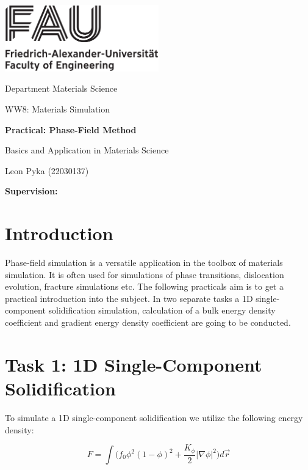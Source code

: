 




%
\begin{titlepage}
\begin{center}
\includegraphics[width=0.5\textwidth]{graphics/FAU_TechFak_EN_H_black.eps}

\LARGE Department Materials Science

\Large WW8: Materials Simulation

\LARGE \textbf{Practical: Phase-Field Method}

\Large Basics and Application in Materials Science



\vfil
\Large Leon Pyka (22030137)



\Large \textbf{Supervision: }
\end{center}

\thispagestyle{empty}
%
\end{titlepage}
%

\setcounter{page}{1}

\tableofcontents
\newpage
\section{Introduction}
Phase-field simulation is a versatile application in the toolbox of materials simulation. It is often used for simulations of phase transitions, dislocation evolution, fracture simulations etc. The following practicals aim is to get a practical introduction into the subject. In two separate tasks a 1D single-component solidification simulation, calculation of a bulk energy density coefficient and gradient energy density coefficient are going to be conducted. 

\section{Task 1: 1D Single-Component Solidification} \label{sec:task1}

To simulate a 1D single-component solidification we utilize the following energy density:

\begin{equation}
	F = \int \bigl( f_{0} \phi^{2}(1- \phi)^{2}  + \frac{K_{\phi}}{2} \lvert \nabla \phi \rvert ^{2} \bigr) d \vec{r}
\end{equation}

